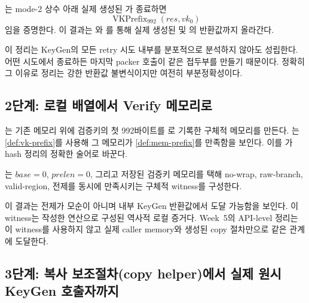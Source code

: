 \begin{verified}
\label{thm:packer-prefix}
는 mode-2 상수 아래 실제 생성된
가 종료하면
\[
  \operatorname{VKPrefix}_{992}(res,vk_0)
\]
임을 증명한다. 이 결과는
와
를 통해 실제 생성된
 및
의 반환값까지 올라간다.
\end{verified}

이 정리는 KeyGen의 모든 retry 시도 내부를 분포적으로 분석하지 않아도 성립한다.
어떤 시도에서 종료하든 마지막 packer 호출이 같은 접두부를 만들기 때문이다.
정확히 그 이유로 정리는 강한 반환값 불변식이지만 여전히 부분정확성이다.

\subsection{2단계: 로컬 배열에서 Verify 메모리로}

는 기존 메모리 위에
검증키의 첫 992바이트를 로 기록한 구체적 메모리를 만든다.
는
\cref{def:vk-prefix}를 사용해 그 메모리가 \cref{def:mem-prefix}를 만족함을
보인다. 이를 가 hash 정리의 정확한
술어로 바꾼다.

\begin{verified}
\label{thm:memory-witness}
는
\(base=0\), \(prelen=0\), 그리고 저장된 검증키 메모리를 택해 no-wrap,
raw-branch, valid-region,  전제를 동시에 만족시키는
구체적 witness를 구성한다.
\end{verified}

이 결과는 전제가 모순이 아니며 내부 KeyGen 반환값에서 도달 가능함을 보인다.
이 witness는 작성한  연산으로 구성된 역사적 로컬 증거다.
Week~5의 API-level 정리는 이 witness를 사용하지 않고 실제 caller memory와
생성된 copy 절차만으로 같은 관계에 도달한다.

\subsection{3단계: 복사 보조절차(copy helper)에서 실제 원시 KeyGen 호출자까지}

